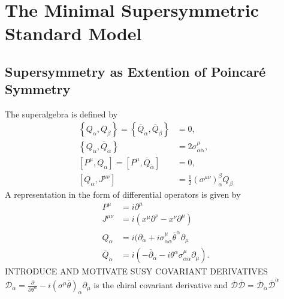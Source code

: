 \section{The Minimal Supersymmetric Standard Model}


\subsection{Supersymmetry as Extention of Poincaré Symmetry}
The superalgebra is defined by
\begin{align}
\left\{Q_\alpha,Q_\beta\right\} = \left\{\overline{Q}_{\dot{\alpha}},\overline{Q}_{\dot{\beta}}\right\} &= 0,  \nonumber\\
\left\{Q_\alpha,\overline{Q}_{\dot{\alpha}}\right\} &= 2\sigma^\mu_{\alpha\dot{\alpha}}, \nonumber\\
[P^\mu,Q_\alpha] = [P^\mu,\overline{Q}_{\dot{\alpha}}] &= 0, \nonumber \\
[Q_\alpha, J^{\mu\nu}] &= \frac{1}{2} (\sigma^{\mu\nu})_\alpha^\beta Q_\beta
\end{align}
A representation in the form of differential operators is given by
\begin{align}
P^\mu &= i\partial^\mu\nonumber\\
J^{\mu\nu} &= i(x^\mu\partial^\nu - x^\nu\partial^\mu)\nonumber\\
Q_\alpha &= i(\partial_\alpha + i\sigma^\mu_{\alpha\dot{\alpha}}\overline{\theta}^{\dot{\alpha}}\partial_\mu\nonumber\\
\overline{Q}_{\dot{\alpha}} &= i(-\overline{\partial}_{\dot{\alpha}} - i \theta^\alpha \sigma^\mu_{\alpha\dot{\alpha}}\partial_\mu).
\end{align}
INTRODUCE AND MOTIVATE SUSY COVARIANT DERIVATIVES $\mathcal{D}_\alpha = \frac{\partial}{\partial \theta^\alpha} - i(\sigma^\mu\overline{\theta})_\alpha\partial_\mu$ is the chiral covariant derivative and $\overline{\mathcal{D}}\overline{\mathcal{D}} = \overline{\mathcal{D}}_{\dot{\alpha}}\overline{\mathcal{D}}^{\dot{\alpha}}$

